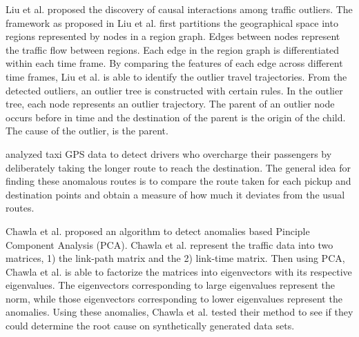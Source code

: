 \documentclass{sig-alternate}
\begin{document}
Liu et al. \cite{Liu2011} proposed the discovery of causal interactions among traffic outliers. The framework as proposed in Liu et al.\cite{Liu2011} first partitions the geographical space into regions represented by nodes in a region graph. Edges between nodes represent the traffic flow between regions. Each edge in the region graph is differentiated within each time frame. By comparing the features of each edge across different time frames, Liu et al. is able to identify the outlier travel trajectories. From the detected outliers, an outlier tree is constructed with certain rules. In the outlier tree, each node represents an outlier trajectory. The parent of an outlier node occurs before in time and the destination of the parent is the origin of the child. The cause of the outlier, is the parent.


\cite{Ge2011,Zhang2011,Zhang2012} analyzed taxi GPS data to detect drivers who overcharge their passengers by deliberately taking the longer route to reach the destination. The general idea for finding these anomalous routes is to compare the route taken for each pickup and destination points and obtain a measure of how much it deviates from the usual routes.

Chawla et al. \cite{Chawla2012} proposed an algorithm to detect anomalies based Pinciple Component Analysis (PCA). Chawla et al. \cite{Chawla2012} represent the traffic data into two matrices, 1) the link-path matrix and the 2) link-time matrix. Then using PCA, Chawla et al. \cite{Chawla2012} is able to factorize the matrices into eigenvectors with its respective eigenvalues. The eigenvectors corresponding to large eigenvalues represent the norm, while those eigenvectors corresponding to lower eigenvalues represent the anomalies. Using these anomalies, Chawla et al. \cite{Chawla2012} tested their method to see if they could determine the root cause on synthetically generated data sets.
\end{document}
